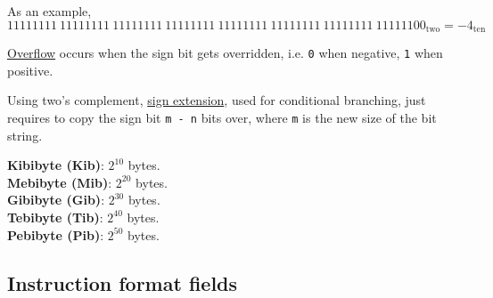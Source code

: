 \documentclass[11pt]{article}
\begin{document}
As an example,
\vspace{-1em}
$$11111111 \ 11111111 \ 11111111 \ 11111111 \ 11111111 \ 11111111 \ 11111111 \ 11111100_{\text{two}}=-4_{\text{ten}}$$

\underline{Overflow} occurs when the sign bit gets overridden, i.e. \texttt{0} when negative, \texttt{1} when positive.

Using two's complement, \underline{sign extension}, used for conditional branching, just requires to copy the sign bit \texttt{m - n} bits over, where \texttt{m} is the new size of the bit string.

\begin{tcolorbox}[
    enhanced,
    attach boxed title to top left={xshift=6mm,yshift=-1.5mm},
    colback=moonstoneblue!20,
    colframe=moonstoneblue,
    colbacktitle=moonstoneblue,
    title=Power of 2 prefix definitions,
    fonttitle=\bfseries\color{white},
    boxed title style={size=small,colframe=moonstoneblue,sharp corners},
    sharp corners,
    label=box:logic-types,
]
    {\color{moondark}\textbf{Kibibyte (Kib)}}: $2^{10}$ bytes. \\
    {\color{moondark}\textbf{Mebibyte (Mib)}}: $2^{20}$ bytes. \\
    {\color{moondark}\textbf{Gibibyte (Gib)}}: $2^{30}$ bytes. \\
    {\color{moondark}\textbf{Tebibyte (Tib)}}: $2^{40}$ bytes. \\
    {\color{moondark}\textbf{Pebibyte (Pib)}}: $2^{50}$ bytes.
\end{tcolorbox}

\pagebreak

\subsection*{Instruction format fields}
\end{document}
